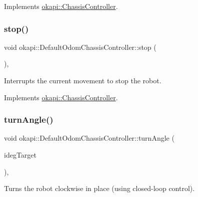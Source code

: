 Implements \mbox{\hyperlink{classokapi_1_1ChassisController_a37ae36ec8936272eb31e3baed7eed417}{okapi\+::\+Chassis\+Controller}}.

\mbox{\label{classokapi_1_1DefaultOdomChassisController_af6a98415e2c4e17dfec77e215efb1a41}} 
\subsubsection{\texorpdfstring{stop()}{stop()}}
{\footnotesize\ttfamily void okapi\+::\+Default\+Odom\+Chassis\+Controller\+::stop (\begin{DoxyParamCaption}{ }\end{DoxyParamCaption})\hspace{0.3cm}{\ttfamily [override]}, {\ttfamily [virtual]}}

Interrupts the current movement to stop the robot. 

Implements \mbox{\hyperlink{classokapi_1_1ChassisController_ac67edbbbe1c8480c4503b9875a3719cd}{okapi\+::\+Chassis\+Controller}}.

\mbox{\label{classokapi_1_1DefaultOdomChassisController_a4ba07ac4bea9ff2d8aea30be72f6a0ea}} 
\subsubsection{\texorpdfstring{turnAngle()}{turnAngle()}\hspace{0.1cm}{\footnotesize\ttfamily [1/2]}}
{\footnotesize\ttfamily void okapi\+::\+Default\+Odom\+Chassis\+Controller\+::turn\+Angle (\begin{DoxyParamCaption}\item[{Q\+Angle}]{ideg\+Target }\end{DoxyParamCaption})\hspace{0.3cm}{\ttfamily [override]}, {\ttfamily [virtual]}}

Turns the robot clockwise in place (using closed-\/loop control).


